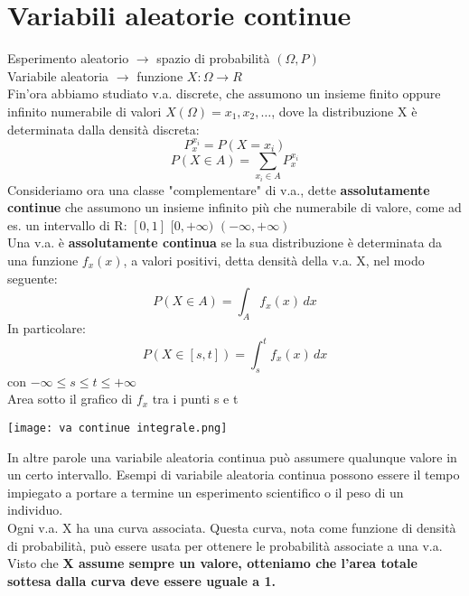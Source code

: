 \section{Variabili aleatorie continue}
Esperimento aleatorio $\to$ spazio di probabilità $(\Omega, P)$
\\ Variabile aleatoria $\to$ funzione $X:\Omega \to R$
\\Fin'ora abbiamo studiato v.a. discrete, che assumono un insieme finito oppure
infinito numerabile di valori $X(\Omega) = {x_1, x_2, \dots}$, dove la distribuzione
X è determinata dalla densità discreta:
\begin{equation*}
    P_x^{x_i} = P(X=x_i)
\end{equation*}
\begin{equation}
    P(X \in A) = \sum_{x_i \in A}P_x^{x_i}  
\end{equation}
Consideriamo ora una classe "complementare" di v.a., dette \textbf{assolutamente continue}
che assumono un insieme infinito più che numerabile di valore, come ad es. un intervallo
di R: $[0, 1]$ $[0, +\infty)$ $(-\infty, +\infty)$
\\ Una v.a. è \textbf{assolutamente continua} se la sua distribuzione è determinata
da una funzione $f_x(x)$, a valori positivi, detta densità della v.a. X, nel modo
seguente:
\begin{equation*}
    P(X \in A) = \int_{A}f_x (x) \,dx 
\end{equation*}
In particolare:
\begin{equation*}
    P(X\in[s,t]) = \int_{s}^{t} f_x (x)\,dx 
\end{equation*}
con $-\infty \leq s \leq t \leq +\infty$
\\Area sotto il grafico di $f_x$ tra i punti s e t
\begin{center}
    \texttt{[image: va continue integrale.png]}
\end{center}
In altre parole una variabile aleatoria continua può assumere qualunque valore in un
certo intervallo. Esempi di variabile aleatoria continua possono essere il tempo impiegato a
portare a termine un esperimento scientifico o il peso di un individuo.
\\ Ogni v.a. X ha una curva associata. Questa curva, nota come funzione di densità
di probabilità, può essere usata per ottenere le probabilità associate a una v.a.
\\ Visto che \textbf{X assume sempre un valore, otteniamo che l'area totale sottesa dalla curva
deve essere uguale a 1.}
